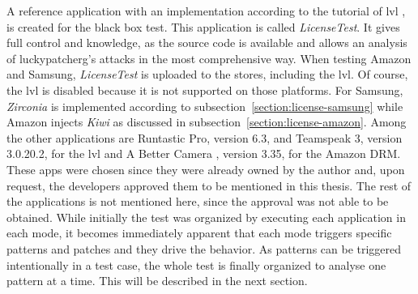 A reference application with an implementation according to the tutorial of \gls{lvl} \cite{developersLicensingAdding}, is created for the black box test.
This application is called \textit{LicenseTest}.
It gives full control and knowledge, as the source code is available and allows an analysis of \gls{luckypatcherg}’s attacks in the most comprehensive way.
\newline
When testing Amazon and Samsung, \textit{LicenseTest} is uploaded to the stores, including the \gls{lvl}.
Of course, the \gls{lvl} is disabled because it is not supported on those platforms.
For Samsung, \textit{Zirconia} is implemented according to subsection~\ref{section:license-samsung} while Amazon injects \textit{Kiwi} as discussed in subsection~\ref{section:license-amazon}.
\newline
Among the other applications are Runtastic Pro\cite{runtasticApp}, version 6.3, and Teamspeak 3\cite{teamspeakApp}, version 3.0.20.2, for the \gls{lvl} and A Better Camera \cite{abettercamera}, version 3.35, for the Amazon DRM.
These apps were chosen since they were already owned by the author and, upon request, the developers approved them to be mentioned in this thesis.
The rest of the applications is not mentioned here, since the approval was not able to be obtained.
\newline
While initially the test was organized by executing each application in each mode, it becomes immediately apparent that each mode triggers specific patterns and patches and they drive the behavior.
As patterns can be triggered intentionally in a test case, the whole test is finally organized to analyse one pattern at a time.
This will be described in the next section.
